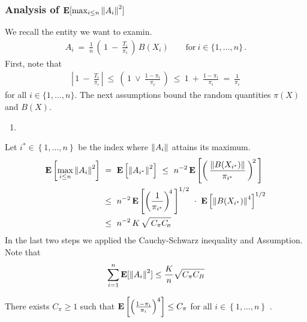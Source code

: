 \subsubsection*{
  Analysis of 
  $
  \mathbf{E}[\max_{i \le n}\left\lVert A_i\right\rVert^2]
  $
}
We recall the entity we want to examin.
\begin{gather}
  A_i
  \ 
  =
  \ 
  \frac{1}{n}
  \,
  \left( 
    \,
    1
    \ 
    -
    \ 
    \frac{T_i}{\pi_i}
    \,
  \right)
  \,
  B(X_i)
  \qquad
  \text{for}
  \ 
  i\in \{1, \ldots, n\}\,.
\end{gather}
First, note that
\begin{gather}
  \left| 
    \,
    1
    \ 
    -
    \ 
    \frac{T_i}{\pi_i}
    \,
  \right|
  \ 
  \le
  \ 
  \left( 
    \,
  1
  \ 
  \lor
  \ 
  \frac{1-\pi_i}{\pi_i}
  \,
  \right)
  \ 
  \le
  \ 
  1
  \ 
  +
  \ 
  \frac{1-\pi_i}{\pi_i}
  \ 
  =
  \ 
  \frac{1}{\pi_i}
\end{gather}
for all
$
  i\in \{1, \ldots, n\}
$.
The next assumptions bound the random quantities $\pi(X)$ and $B(X)$.

\begin{assumptions*}
  \begin{enumerate}[label={(\roman*)}]
    \item
  \end{enumerate}
\end{assumptions*}


Let
$i^*\in \left\{ 1, \ldots, n \right\}$
be the index where 
$
\left\lVert A_i\right\rVert
$
attains its maximum.
\begin{align}
  \begin{split}
  \E\left[\max_{i \le n}\norm{A_i}^2\right]
  &
  \ 
  =
  \ 
  \E\left[\norm{A_{i^*}}^2\right]
  \ 
  \le
  \ 
  n^{-2}
  \,
  \E \left[ 
    \left(
      \,
      \frac{
    \norm{B(X_{i^*})}
      }{\pi_{i^*}}
      \,
    \right)
    ^{\!2}
    \,
  \right]
  \\
  &
    \ 
  \le
  \ 
  n^{-2}
  \,
  \E \left[ 
    \left(
      \frac{1}{\pi_{i^*}}
    \right)^{\!4}
    \,
  \right]^{1/2}
  \ 
  \cdot
  \ 
  \E\left[
    \norm{B(X_{i^*})}^4
  \right]^{1/2}
  \\
  &
  \ 
  \le
  \ 
  n^{-2}
  \,
  K
  \,
  \sqrt{
    \,
    C_\pi
    C_{\!\scriptscriptstyle B}
  }
\end{split}
\end{align}
In the last two steps we applied the Cauchy-Schwarz inequality
and Assumption. Note that
\begin{gather}
  \sum_{i=1}^{n}
  \mathbf{E}[\left\lVert A_i\right\rVert^2]\le
  \frac{K}{n}\sqrt{C_\pi C_B}
\end{gather}
\begin{assumption}
  There exists $C_\pi \ge 1$ such that
  $
    \mathbf{E}
    \left[ 
    \left(
      \frac{1-\pi_{i}}{\pi_{i}}
    \right)^4
    \right]
    \le C_\pi
  $
  for all $i\in \left\{ 1, \ldots, n \right\}$
  .
\end{assumption}
 
